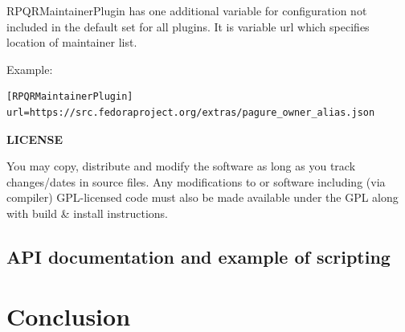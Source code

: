 RPQRMaintainerPlugin has one additional variable for configuration not included in the default set for
all plugins. It is variable url which specifies location of maintainer list.

Example:
\begin{lstlisting}
[RPQRMaintainerPlugin]
url=https://src.fedoraproject.org/extras/pagure_owner_alias.json
\end{lstlisting}

\textbf{LICENSE}

You may copy, distribute and modify the software as long as you track changes/dates in source files.
Any modifications to or software including (via compiler) GPL-licensed code must also be made available
under the GPL along with build \& install instructions.

\section{API documentation and example of scripting}



\chapter{Conclusion}

\blindtext
